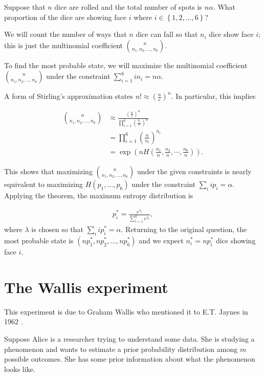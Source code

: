 \documentclass[13pt]{article}
\begin{document}
\begin{example}
  Suppose that $n$ dice are rolled and the total number of spots is $n \alpha$.  What proportion of the dice are showing face $i$ where $i \in \left\{ 1, 2, \dots, 6 \right\}$?
\end{example}

We will count the number of ways that $n$ dice can fall so that $n_i$ dice show face $i$; this is just the multinomial coefficient $\binom{n}{n_1, n_2, \dots, n_6}$.

To find the most probable state, we will maximize the multinomial coefficient $\binom{n}{n_1, n_2, \dots, n_6}$ under the constraint $\sum_{i=1}^{6} i n_i = n \alpha$.

A form of Stirling's approximation states $n! \approx \left ( \frac{n}{e} \right )^{n}$.  In particular, this implies

\begin{align*}
  \binom{n}{n_1, n_2, \dots, n_6} & \approx \frac{\left ( \frac{n}{e} \right )^n}{\prod_{i=1}^{6} \left( \frac{n_i}{e} \right)^n} \\
  &= \prod_{i=1}^{6} \left( \frac{n}{n_i} \right)^{n_i} \\
  & = \exp \left( n H (\frac{n_1}{n}, \frac{n_2}{n}, \cdots, \frac{n_6}{n}) \right).
\end{align*}

This shows that maximizing $\binom{n}{n_1, n_2, \dots, n_6}$ under the given constraints is nearly equivalent to maximizing $H(p_1, \dots, p_6)$ under the constraint $\sum_{i} i p_i = \alpha$.  Applying the theorem, the maximum entropy distribution is

\begin{align*}
  p_i^{*} = \frac{e^{\lambda_i}}{\sum_{i=1}^{6} e^{\lambda_i}},
\end{align*}
where $\lambda$ is chosen so that $\sum_{i} i p_i^{*} = \alpha$.  Returning to the original question, the most probable state is $(np_1^{*}, np_2^{*}, \dots, n p_6^{*})$ and we expect $n_i^{*} = n p_i^{*}$ dice showing face $i$.


\section{The Wallis experiment}

This experiment is due to Graham Wallis who mentioned it to E.T. Jaynes in 1962 \cite{jaynes2003probability}.

Suppose Alice is a researcher trying to understand some data.  She is studying a phenomenon and wants to estimate a prior probability distribution among $m$ possible outcomes. She has some prior information about what the phenomenon looks like.  
\end{document}
